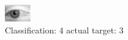 \begin{figure}[h!]
\begin{center}
\includegraphics[width=0.60\columnwidth]{figures/ID2828_class_4_target_3.png}
\end{center}
\caption{ Classification: 4 actual target: 3}
\label{fig:ID2828_class_4_target_3}
\end{figure}
